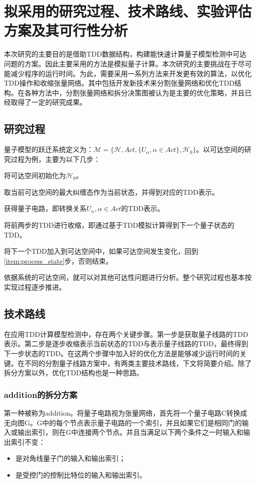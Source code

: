 \section{拟采用的研究过程、技术路线、实验评估方案及其可行性分析}
本次研究的主要目的是借助TDD数据结构，构建能快速计算量子模型检测中可达问题的方案。因此主要采用的方法是模拟量子计算。本次研究的主要挑战在于尽可能减少程序的运行时间。为此，需要采用一系列方法来开发更有效的算法，以优化TDD操作和收缩张量网络。其中包括开发新技术来分割张量网络和优化TDD结构。在各种方法中，分割张量网络和拆分决策图被认为是主要的优化策略，并且已经取得了一定的研究成果。
\subsection{研究过程}
量子模型的跃迁系统定义为：$\mathcal{M}=\{\mathcal{H},Act,\{U_\alpha,\alpha\in Act\},\mathcal{H}_0\}$。以可达空间的研究过程为例，主要为以下几步：
\begin{myen}
	\item \label{item:process_inital}将可达空间初始化为$\mathcal{H}_0$。
	\item \label{item:process_state}取当前可达空间的最大纠缠态作为当前状态，并得到对应的TDD表示。
	\item \label{item:process_cir}获得量子电路，即转换关系$U_\alpha,\alpha\in Act$的TDD表示。
	\item \label{item:process_cont} 将前两步的TDD进行收缩，即通过基于TDD模拟计算得到下一个量子状态的TDD。
	\item \label{item:process_end}将下一个TDD加入到可达空间中，如果可达空间发生变化，回到\ref{item:process_state}步，否则结束。
\end{myen}
	
依据系统的可达空间，就可以对其他可达性问题进行分析。整个研究过程也基本按实现过程逐步推进。
\subsection{技术路线}
在应用TDD计算模型检测中，存在两个关键步骤。第一步是获取量子线路的TDD表示。第二步是逐步收缩表示当前状态的TDD与表示量子线路的TDD，最终得到下一步状态的TDD。在这两个步骤中加入好的优化方法是能够减少运行时间的关键。在不同的分割量子线路方案中，有两类主要技术路线，下文将简要介绍。除了拆分方案以外，优化TDD结构也是一种思路。
\subsubsection{addition的拆分方案}
第一种被称为addition\citep{chen2018classical}。将量子电路视为张量网络，首先将一个量子电路C转换成无向图G。G中的每个节点表示量子电路的一个索引，并且如果它们是相同门的输入或输出索引，则在G中连接两个节点。并且当满足以下两个条件之一时输入和输出索引不变：
\begin{itemize}
	\item 是对角线量子门的输入和输出索引；
	\item 是受控门的控制比特位的输入和输出索引。
\end{itemize}
	
